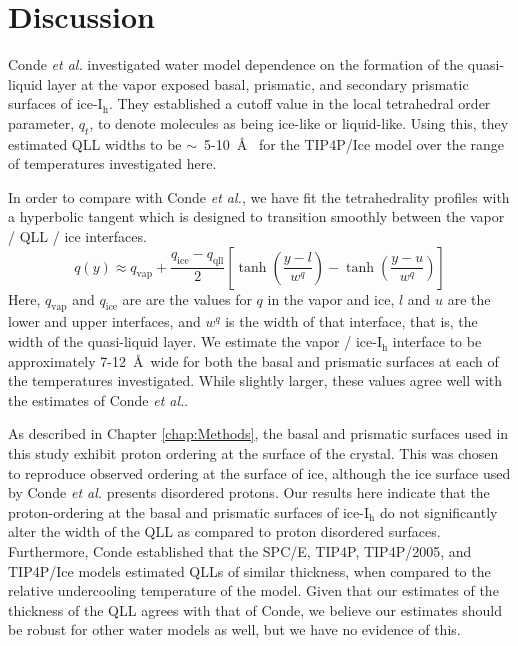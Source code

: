 \section{Discussion}
Conde \textit{et al.} investigated water model dependence on the
formation of the quasi-liquid layer at the vapor exposed basal,
prismatic, and secondary prismatic surfaces of
ice-I$_\mathrm{h}$.\cite{Conde2008} They established a cutoff value in
the local tetrahedral order parameter, $q_t$, to denote molecules as
being ice-like or liquid-like. Using this, they estimated QLL widths
to be $\sim$~5-10~\AA~ for the TIP4P/Ice model over the range of
temperatures investigated here. 

In order to compare with Conde
\textit{et al.}, we have fit the tetrahedrality profiles with a
hyperbolic tangent which is designed to transition smoothly between
the vapor / QLL / ice interfaces.
\begin{equation}\label{eq:qllFit}
q(y) \approx
q_\mathrm{vap}+\frac{q_\mathrm{ice}-q_\mathrm{qll}}{2}\left[\tanh\left(\frac{y-l}{w^q}\right)-\tanh\left(\frac{y-u}{w^q}\right)\right]
\end{equation}
Here, $q_\mathrm{vap}$ and $q_\mathrm{ice}$ are are the values for $q$
in the vapor and ice, $l$ and $u$ are the lower and upper interfaces,
and $w^q$ is the width of that interface, that is, the width of the
quasi-liquid layer.  We estimate the vapor / ice-I$_\mathrm{h}$
interface to be approximately 7-12~\AA~wide for both the basal and
prismatic surfaces at each of the temperatures investigated. While
slightly larger, these values agree well with the estimates of Conde
\textit{et al.}. 

As described in Chapter \ref{chap:Methods}, the basal and prismatic
surfaces used in this study exhibit proton ordering at the surface of
the crystal. This was chosen to reproduce observed ordering at the
surface of ice, although the ice surface used by Conde \textit{et al.}
presents disordered protons. Our results here indicate that the
proton-ordering at the basal and prismatic surfaces of
ice-I$_\mathrm{h}$ do not significantly alter the width of the QLL as
compared to proton disordered surfaces.  Furthermore, Conde
established that the SPC/E, TIP4P, TIP4P/2005, and TIP4P/Ice models
estimated QLLs of similar thickness, when compared to the relative
undercooling temperature of the model.\cite{Conde2008} Given that our
estimates of the thickness of the QLL agrees with that of Conde, we
believe our estimates should be robust for other water models as well,
but we have no evidence of this.

